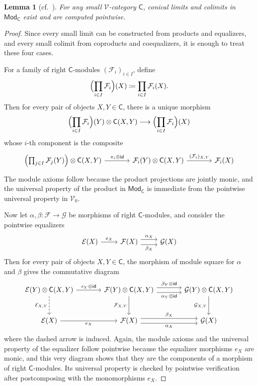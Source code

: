 \documentclass[11pt,onecolumn]{article}
\newcommand{\id}{\mathsf{id}}
\newcommand{\cV}{\mathscr{V}}
\newcommand{\cC}{\mathsf{C}}
\newcommand{\Mod}{\mathsf{Mod}}
\theoremstyle{plain}
\newtheorem{lem}[lem]{Lemma}
\theoremstyle{remark}
\theoremstyle{definition}
\begin{document}
\begin{lem}[{cf.~\cite[\S\S~3.3 and~3.8]{Kelly}}]
	\label{lem:module_pointwise_conical}
	For any small $\cV$-category $\cC$, conical limits and colimits in $\Mod_\cC$ exist and are computed pointwise.
\end{lem}

\begin{proof}
	Since every small limit can be constructed from products and equalizers, and every small colimit from coproducts and coequalizers, it is enough to treat these four cases.

	For a family of right $\cC$-modules $(\mathcal{F}_i)_{i \in I}$, define
	\[
		\Bigl(\prod_{i \in I} \mathcal{F}_i\Bigr)(X) \coloneqq \prod_{i \in I} \mathcal{F}_i(X).
	\]
	Then for every pair of objects $X,Y \in \cC$, there is a unique morphism
	\[
		\Bigl(\prod_{i \in I} \mathcal{F}_i\Bigr)(Y) \otimes \cC(X,Y)
		\longrightarrow
		\Bigl(\prod_{i \in I} \mathcal{F}_i\Bigr)(X)
	\]
	whose $i$-th component is the composite
	\[
		\begin{tikzcd}[column sep=large]
			\Bigl(\prod_{j \in I} \mathcal{F}_j(Y)\Bigr) \otimes \cC(X,Y) \ar[r, "\pi_i \otimes \id"] & \mathcal{F}_i(Y) \otimes \cC(X,Y) \ar[r, "(\mathcal{F}_i)_{X,Y}"] & \mathcal{F}_i(X)
		\end{tikzcd}
	\]
	The module axioms follow because the product projections are jointly monic, and the universal property of the product in $\Mod_\cC$ is immediate from the pointwise universal property in $\cV_0$.

	Now let $\alpha,\beta \colon \mathcal{F} \to \mathcal{G}$ be morphisms of right $\cC$-modules, and consider the pointwise equalizers
	\[
		\begin{tikzcd}
			\mathcal{E}(X) \ar[r, "e_X"] & \mathcal{F}(X) \ar[r, shift left=1.5, "\alpha_X"] \ar[r, shift right=1.5, "\beta_X"'] & \mathcal{G}(X)
		\end{tikzcd}
	\]
	Then for every pair of objects $X,Y \in \cC$, the morphism of module square for $\alpha$ and $\beta$ gives the commutative diagram
	\[
		\begin{tikzcd}[column sep=large, row sep=large]
			\mathcal{E}(Y) \otimes \cC(X,Y)
				\ar[d, dashed, "\mathcal{E}_{X,Y}"']
				\ar[r, "e_Y \otimes \id"]
			&
			\mathcal{F}(Y) \otimes \cC(X,Y)
				\ar[d, "\mathcal{F}_{X,Y}"']
				\ar[r, shift left=.8ex, "\beta_Y \otimes \id"]
				\ar[r, shift right=.8ex, "\alpha_Y \otimes \id"']
			&
			\mathcal{G}(Y) \otimes \cC(X,Y)
					\ar[d, "\mathcal{G}_{X,Y}"']
			\\
			\mathcal{E}(X)
				\ar[r, "e_X"']
			&
			\mathcal{F}(X) 
				\ar[r, shift right=.8ex, "\alpha_X"']
				\ar[r, shift left=.8ex, "\beta_X"]
			&
			\mathcal{G}(X)
		\end{tikzcd}
	\]
	where the dashed arrow is induced.
	Again, the module axioms and the universal property of the equalizer follow pointwise because the equalizer morphisms $e_X$ are monic,
	and this very diagram shows that they are the components of a morphism of right $\cC$-modules.
	Its universal property is checked by pointwise verification after postcomposing with the monomorphisms $e_X$.


\end{proof}
\end{document}
